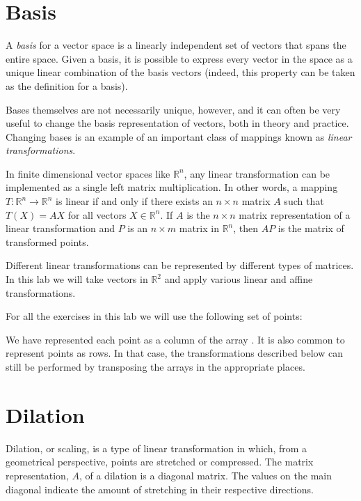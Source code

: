 \label{lab:ChangeBasis}



\section*{Basis}

A \emph{basis} for a vector space is a linearly independent set of vectors that spans the entire space. Given a basis, it is possible to express every vector in the space as a unique linear combination of the basis vectors (indeed, this property can be taken as the definition for a basis).

Bases themselves are not necessarily unique, however, and it can often be very useful to change the basis representation of vectors, both in theory and practice. Changing bases is an example of an important class of mappings known as \emph{linear transformations}.

In finite dimensional vector spaces like $\mathbb{R}^n$, any linear
transformation can be implemented as a single left matrix multiplication.
In other words, a mapping $T : \mathbb{R}^n \to \mathbb{R}^n$ is linear if and only if there exists an $n \times n$ matrix $A$ such that $T\left(X\right) = AX$ for all vectors $X \in \mathbb{R}^n$. If $A$ is the $n \times n$ matrix representation of a linear transformation and $P$ is an $n \times m$ matrix in $\mathbb{R}^n$, then $AP$ is the matrix of transformed points.

Different linear transformations can be represented by different types of matrices. In this lab we will take vectors in $\mathbb{R}^2$ and apply various linear and affine transformations.

For all the exercises in this lab we will use the following set of points:


We have represented each point as a column of the array .
It is also common to represent points as rows. In that case, the transformations described below can still be performed by transposing the arrays in the appropriate places.

\section*{Dilation}
Dilation, or scaling, is a type of linear transformation in which, from a geometrical perspective, points are stretched or compressed.
The matrix representation, $A$, of a dilation is a diagonal matrix. The values on the main diagonal indicate the amount of stretching in their respective directions.

